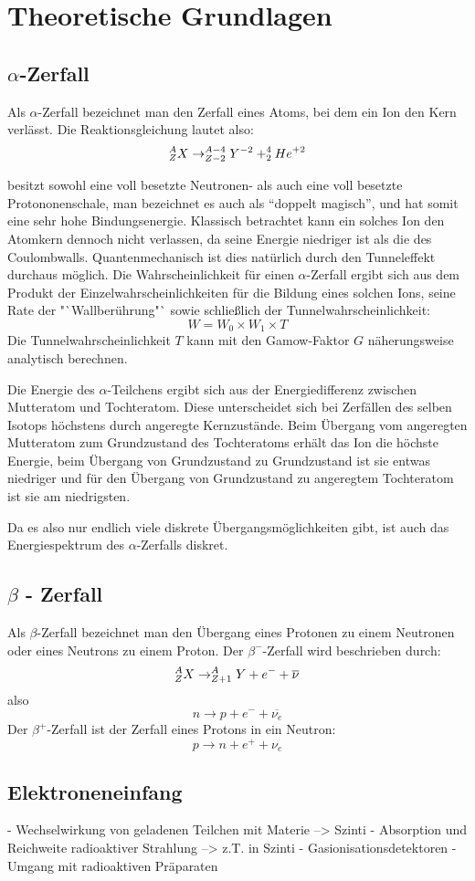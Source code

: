 \section{Theoretische Grundlagen}

\subsection{$\alpha$-Zerfall}
Als $\alpha$-Zerfall bezeichnet man den Zerfall eines Atoms, bei dem ein  Ion den Kern verlässt. Die Reaktionsgleichung lautet also:
$$ ^{A}_{Z}{X} \rightarrow ^{A-4}_{Z-2}{Y}^{-2} + ^{4}_{2}{He}^{+2} $$

 besitzt sowohl eine voll besetzte Neutronen- als auch eine voll besetzte Protononenschale, man bezeichnet es auch als "`doppelt magisch"', und hat somit eine sehr hohe Bindungsenergie. Klassisch betrachtet kann ein solches Ion den Atomkern dennoch nicht verlassen, da seine Energie niedriger ist als die des Coulombwalls. Quantenmechanisch ist dies natürlich durch den Tunneleffekt durchaus möglich. Die Wahrscheinlichkeit für einen $\alpha$-Zerfall ergibt sich aus dem Produkt der Einzelwahrscheinlichkeiten für die Bildung eines solchen Ions, seine Rate der "`Wallberührung"` sowie schließlich der Tunnelwahrscheinlichkeit:
$$ W = W_0 \times W_1 \times T $$
Die Tunnelwahrscheinlichkeit $T$ kann mit den Gamow-Faktor $G$ näherungsweise analytisch berechnen.

Die Energie des $\alpha$-Teilchens ergibt sich aus der Energiedifferenz zwischen Mutteratom und Tochteratom. Diese unterscheidet sich bei Zerfällen des selben Isotops höchstens durch angeregte Kernzustände. Beim Übergang vom angeregten Mutteratom zum Grundzustand des Tochteratoms erhält das Ion die höchste Energie, beim Übergang von Grundzustand zu Grundzustand ist sie entwas niedriger und für den Übergang von Grundzustand zu angeregtem Tochteratom ist sie am niedrigsten.

Da es also nur endlich viele diskrete Übergangsmöglichkeiten gibt, ist auch das Energiespektrum des $\alpha$-Zerfalls diskret.  

\subsection{$\beta$ - Zerfall}
Als $\beta$-Zerfall bezeichnet man den Übergang eines Protonen zu einem Neutronen oder eines Neutrons zu einem Proton. Der $\beta^-$-Zerfall wird beschrieben durch:
$$ ^{A}_{Z}{X} \rightarrow ^{A}_{Z+1}{Y} + e^- + \overline{\nu} $$
also
$$ n \rightarrow p + e^- + \overline{\nu_e} $$
Der $\beta^+$-Zerfall ist der Zerfall eines Protons in ein Neutron:
$$p \rightarrow n + e^+ + \nu_e$$

\subsection{Elektroneneinfang}


- Wechselwirkung von geladenen Teilchen mit Materie --> Szinti
- Absorption und Reichweite radioaktiver Strahlung --> z.T. in Szinti
- Gasionisationsdetektoren
- Umgang mit radioaktiven Präparaten
